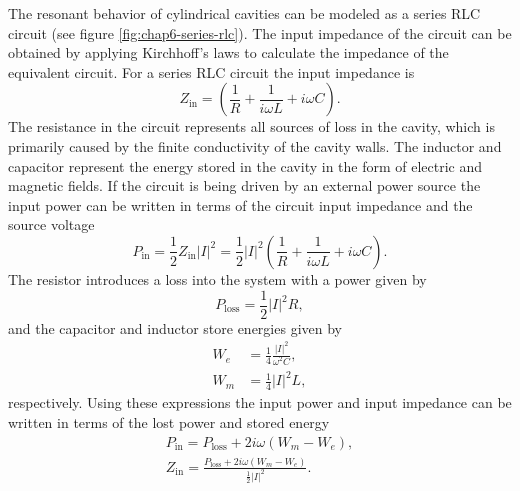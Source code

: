 The resonant behavior of cylindrical cavities can be modeled as a series RLC circuit (see figure \ref{fig:chap6-series-rlc}). The input impedance of the circuit can be obtained by applying Kirchhoff's laws to calculate the impedance of the equivalent circuit. For a series RLC circuit the input impedance is 
\begin{equation}
    Z_\mathrm{in}=\left(\frac{1}{R}+\frac{1}{i\omega L}+i\omega C\right).
\end{equation}
The resistance in the circuit represents all sources of loss in the cavity, which is primarily caused by the finite conductivity of the cavity walls. The inductor and capacitor represent the energy stored in the cavity in the form of electric and magnetic fields. If the circuit is being driven by an external power source the input power can be written in terms of the circuit input impedance and the source voltage 
\begin{equation}
    P_\mathrm{in} = \frac{1}{2}Z_\mathrm{in}|I|^2=\frac{1}{2}|I|^2\left(\frac{1}{R}+\frac{1}{i\omega L}+i\omega C\right).
\end{equation} 
The resistor introduces a loss into the system with a power given by 
\begin{equation}
    P_\mathrm{loss} = \frac{1}{2}|I|^2R,
\end{equation}
and the capacitor and inductor store energies given by
\begin{align}
    W_e&=\frac{1}{4}\frac{|I|^2}{\omega^2 C},\\
    W_m&=\frac{1}{4}|I|^2 L,
\end{align}
respectively. Using these expressions the input power and input impedance can be written in terms of the lost power and stored energy 
\begin{align}
    P_\mathrm{in}=P_\mathrm{loss}+2i\omega(W_m-W_e),\\
    Z_\mathrm{in}=\frac{P_\mathrm{loss}+2i\omega(W_m-W_e)}{\frac{1}{2}|I|^2}.
\end{align}

